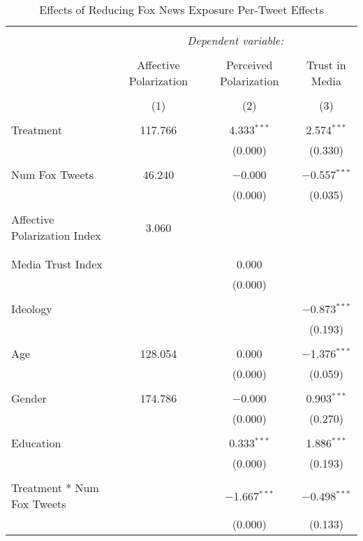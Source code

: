 
\begin{table}[!htbp] \centering 
  \caption{Effects of Reducing Fox News Exposure Per-Tweet Effects} 
  \label{} 
\begin{tabular}{@{\extracolsep{5pt}}lccc} 
\\[-1.8ex]\hline 
\hline \\[-1.8ex] 
 & \multicolumn{3}{c}{\textit{Dependent variable:}} \\ 
\cline{2-4} 
\\[-1.8ex] & Affective Polarization & Perceived Polarization & Trust in Media \\ 
\\[-1.8ex] & (1) & (2) & (3)\\ 
\hline \\[-1.8ex] 
 Treatment & 117.766 & 4.333$^{***}$ & 2.574$^{***}$ \\ 
  &  & (0.000) & (0.330) \\ 
  & & & \\ 
 Num Fox Tweets & 46.240 & $-$0.000 & $-$0.557$^{***}$ \\ 
  &  & (0.000) & (0.035) \\ 
  & & & \\ 
 Affective Polarization Index & 3.060 &  &  \\ 
  &  &  &  \\ 
  & & & \\ 
 Media Trust Index &  & 0.000 &  \\ 
  &  & (0.000) &  \\ 
  & & & \\ 
 Ideology &  &  & $-$0.873$^{***}$ \\ 
  &  &  & (0.193) \\ 
  & & & \\ 
 Age & 128.054 & 0.000 & $-$1.376$^{***}$ \\ 
  &  & (0.000) & (0.059) \\ 
  & & & \\ 
 Gender & 174.786 & $-$0.000 & 0.903$^{***}$ \\ 
  &  & (0.000) & (0.270) \\ 
  & & & \\ 
 Education &  & 0.333$^{***}$ & 1.886$^{***}$ \\ 
  &  & (0.000) & (0.193) \\ 
  & & & \\ 
 Treatment * Num Fox Tweets &  & $-$1.667$^{***}$ & $-$0.498$^{***}$ \\ 
  &  & (0.000) & (0.133) \\ 

\end{tabular}
\end{table}
